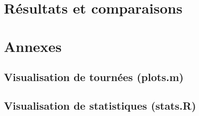 \documentclass[10pt,a4paper]{scrartcl}
\begin{document}
%            
%           
%            
%            
%	        
%	        
%	        

\section{Résultats et comparaisons}
%


\section{Annexes}

\subsection{Visualisation de tournées (plots.m)}

%

\subsection{Visualisation de statistiques (stats.R)}
%
\end{document}
